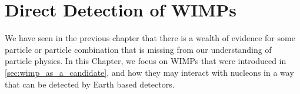 \chapter{Direct Detection of WIMPs}
\label{chap:detection_theory}
\par
We have seen in the previous chapter that there is a wealth of evidence for some particle or particle combination that is missing from our understanding of particle physics.
In this Chapter, we focus on WIMPs that were introduced in \autoref{sec:wimp_as_a_candidate}, and how they may interact with nucleons in a way that can be detected by Earth based detectors.





